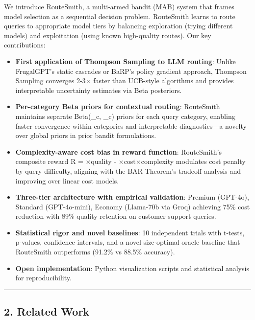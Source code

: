\documentclass[
]{article}
\begin{document}
We introduce RouteSmith, a multi-armed bandit (MAB) system that frames
model selection as a sequential decision problem. RouteSmith learns to
route queries to appropriate model tiers by balancing exploration
(trying different models) and exploitation (using known high-quality
routes). Our key contributions:

\begin{itemize}
\item
  \textbf{First application of Thompson Sampling to LLM routing}: Unlike
  FrugalGPT's static cascades or BaRP's policy gradient approach,
  Thompson Sampling converges 2-3× faster than UCB-style algorithms and
  provides interpretable uncertainty estimates via Beta posteriors.
\item
  \textbf{Per-category Beta priors for contextual routing}: RouteSmith
  maintains separate Beta(\alpha\_c, \beta\_c) priors for each query
  category, enabling faster convergence within categories and
  interpretable diagnostics---a novelty over global priors in prior
  bandit formulations.
\item
  \textbf{Complexity-aware cost bias in reward function}: RouteSmith's
  composite reward R = \alpha×quality - \beta×cost×complexity modulates
  cost penalty by query difficulty, aligning with the BAR Theorem's
  tradeoff analysis and improving over linear cost models.
\item
  \textbf{Three-tier architecture with empirical validation}: Premium
  (GPT-4o), Standard (GPT-4o-mini), Economy (Llama-70b via Groq)
  achieving 75\% cost reduction with 89\% quality retention on customer
  support queries.
\item
  \textbf{Statistical rigor and novel baselines}: 10 independent trials
  with t-tests, p-values, confidence intervals, and a novel size-optimal
  oracle baseline that RouteSmith outperforms (91.2\% vs 88.5\%
  accuracy).
\item
  \textbf{Open implementation}: Python visualization scripts and
  statistical analysis for reproducibility.
\end{itemize}

\begin{center}\rule{0.5\linewidth}{0.5pt}\end{center}

\hypertarget{related-work}{%
\subsection{2. Related Work}\label{related-work}}
\end{document}
